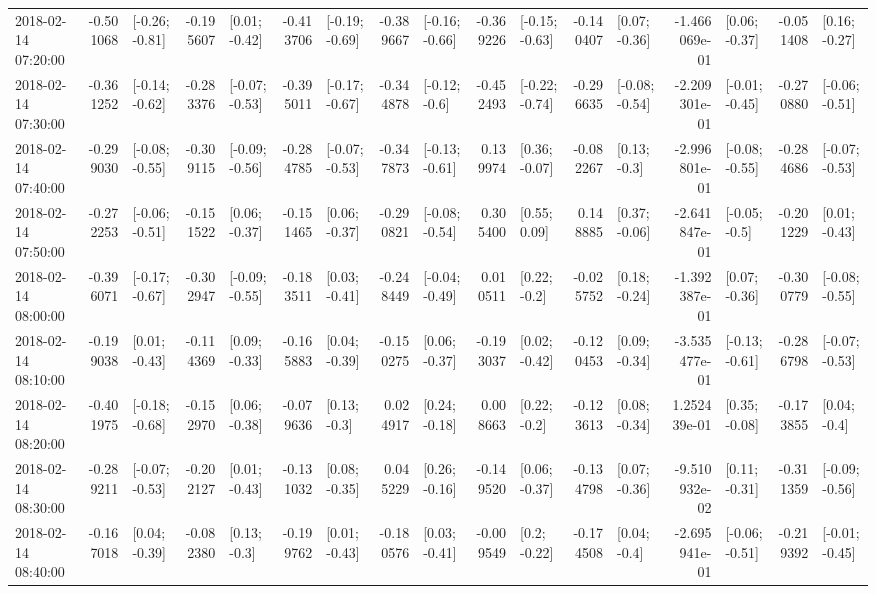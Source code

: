 \begin{tabular}{lrlrlrlrlrlrlrlrl}
2018-02-14 07:20:00 & -0.501068 &  [-0.26; -0.81] & -0.195607 &   [0.01; -0.42] & -0.413706 &  [-0.19; -0.69] & -0.389667 &  [-0.16; -0.66] & -0.369226 &  [-0.15; -0.63] & -0.140407 &   [0.07; -0.36] & -1.466069e-01 &   [0.06; -0.37] & -0.051408 &   [0.16; -0.27] \\
2018-02-14 07:30:00 & -0.361252 &  [-0.14; -0.62] & -0.283376 &  [-0.07; -0.53] & -0.395011 &  [-0.17; -0.67] & -0.344878 &   [-0.12; -0.6] & -0.452493 &  [-0.22; -0.74] & -0.296635 &  [-0.08; -0.54] & -2.209301e-01 &  [-0.01; -0.45] & -0.270880 &  [-0.06; -0.51] \\
2018-02-14 07:40:00 & -0.299030 &  [-0.08; -0.55] & -0.309115 &  [-0.09; -0.56] & -0.284785 &  [-0.07; -0.53] & -0.347873 &  [-0.13; -0.61] &  0.139974 &   [0.36; -0.07] & -0.082267 &    [0.13; -0.3] & -2.996801e-01 &  [-0.08; -0.55] & -0.284686 &  [-0.07; -0.53] \\
2018-02-14 07:50:00 & -0.272253 &  [-0.06; -0.51] & -0.151522 &   [0.06; -0.37] & -0.151465 &   [0.06; -0.37] & -0.290821 &  [-0.08; -0.54] &  0.305400 &    [0.55; 0.09] &  0.148885 &   [0.37; -0.06] & -2.641847e-01 &   [-0.05; -0.5] & -0.201229 &   [0.01; -0.43] \\
2018-02-14 08:00:00 & -0.396071 &  [-0.17; -0.67] & -0.302947 &  [-0.09; -0.55] & -0.183511 &   [0.03; -0.41] & -0.248449 &  [-0.04; -0.49] &  0.010511 &    [0.22; -0.2] & -0.025752 &   [0.18; -0.24] & -1.392387e-01 &   [0.07; -0.36] & -0.300779 &  [-0.08; -0.55] \\
2018-02-14 08:10:00 & -0.199038 &   [0.01; -0.43] & -0.114369 &   [0.09; -0.33] & -0.165883 &   [0.04; -0.39] & -0.150275 &   [0.06; -0.37] & -0.193037 &   [0.02; -0.42] & -0.120453 &   [0.09; -0.34] & -3.535477e-01 &  [-0.13; -0.61] & -0.286798 &  [-0.07; -0.53] \\
2018-02-14 08:20:00 & -0.401975 &  [-0.18; -0.68] & -0.152970 &   [0.06; -0.38] & -0.079636 &    [0.13; -0.3] &  0.024917 &   [0.24; -0.18] &  0.008663 &    [0.22; -0.2] & -0.123613 &   [0.08; -0.34] &  1.252439e-01 &   [0.35; -0.08] & -0.173855 &    [0.04; -0.4] \\
2018-02-14 08:30:00 & -0.289211 &  [-0.07; -0.53] & -0.202127 &   [0.01; -0.43] & -0.131032 &   [0.08; -0.35] &  0.045229 &   [0.26; -0.16] & -0.149520 &   [0.06; -0.37] & -0.134798 &   [0.07; -0.36] & -9.510932e-02 &   [0.11; -0.31] & -0.311359 &  [-0.09; -0.56] \\
2018-02-14 08:40:00 & -0.167018 &   [0.04; -0.39] & -0.082380 &    [0.13; -0.3] & -0.199762 &   [0.01; -0.43] & -0.180576 &   [0.03; -0.41] & -0.009549 &    [0.2; -0.22] & -0.174508 &    [0.04; -0.4] & -2.695941e-01 &  [-0.06; -0.51] & -0.219392 &  [-0.01; -0.45] \\

\end{tabular}
